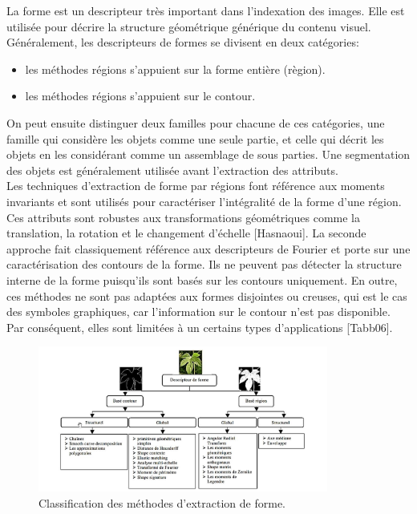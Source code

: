 La forme est un descripteur très important dans l'indexation des images. Elle est utilisée pour décrire la structure géométrique générique du contenu visuel. Généralement, les descripteurs de formes se divisent en deux catégories: 
\begin{itemize}
	\item les méthodes régions s'appuient sur la forme entière (règion). 
	\item les méthodes régions s'appuient sur le contour.
\end{itemize}
On peut ensuite distinguer deux familles pour chacune de ces catégories, une famille qui considère les objets comme une seule partie, et celle qui décrit les objets en les considérant comme un assemblage de sous parties. Une segmentation des objets est généralement utilisée avant l'extraction des attributs.\\

Les techniques d’extraction de forme par régions font référence aux moments invariants et sont utilisés pour caractériser l’intégralité de la forme d’une région. Ces attributs sont robustes aux transformations géométriques comme la translation, la rotation et le changement d’échelle [Hasnaoui]. La seconde approche fait classiquement référence aux descripteurs de Fourier et porte sur une caractérisation des contours de la forme. Ils ne peuvent pas détecter la structure interne de la forme puisqu’ils sont basés sur les contours uniquement. En outre, ces méthodes ne sont pas adaptées aux formes disjointes ou creuses, qui est le cas des symboles graphiques, car l’information sur le contour n’est pas disponible. Par conséquent, elles sont limitées à un certains types d’applications [Tabb06].

\begin{figure}[H]
	\label{fig:forme}
	\centering
	\includegraphics[width=0.85\textwidth]{Figures/forme} %
	
	\caption{Classification des méthodes d'extraction de forme.}
	
\end{figure}

